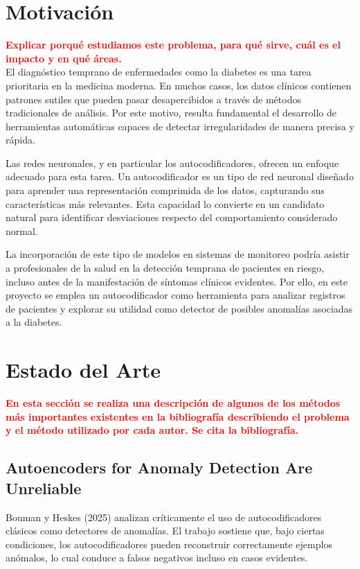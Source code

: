 \documentclass[a4paper,10pt]{book}
\newcommand{\comentario}[1]{\textbf{\textcolor{red}{#1}}}
\begin{document}
\section{Motivación}

\comentario{Explicar porqué estudiamos este problema, para qué sirve, cuál es el impacto y en qué áreas.}\\

El diagnóstico temprano de enfermedades como la diabetes es una tarea prioritaria en la medicina moderna. En muchos casos, los datos clínicos contienen patrones sutiles que pueden pasar desapercibidos a través de métodos tradicionales de análisis. Por este motivo, resulta fundamental el desarrollo de herramientas automáticas capaces de detectar irregularidades de manera precisa y rápida. 
 
Las redes neuronales, y en particular los autocodificadores, ofrecen un enfoque adecuado para esta tarea. Un autocodificador es un tipo de red neuronal diseñado para aprender una representación comprimida de los datos, capturando sus características más relevantes. Esta capacidad lo convierte en un candidato natural para identificar desviaciones respecto del comportamiento considerado normal.  

La incorporación de este tipo de modelos en sistemas de monitoreo podría asistir a profesionales de la salud en la detección temprana de pacientes en riesgo, incluso antes de la manifestación de síntomas clínicos evidentes. Por ello, en este proyecto se emplea un autocodificador como herramienta para analizar registros de pacientes y explorar su utilidad como detector de posibles anomalías asociadas a la diabetes.


\section{Estado del Arte}

\comentario{En esta sección se realiza una descripción de algunos de los métodos más importantes existentes en la bibliografía describiendo el problema y el método utilizado por cada autor. Se cita la bibliografía.}\\

\subsection{Autoencoders for Anomaly Detection Are Unreliable}

Bouman y Heskes (2025) \cite{bouman2025unreliable} analizan críticamente el uso de autocodificadores clásicos como detectores de anomalías. El trabajo sostiene que, bajo ciertas condiciones, los autocodificadores pueden reconstruir correctamente ejemplos anómalos, lo cual conduce a falsos negativos incluso en casos evidentes.
\end{document}

